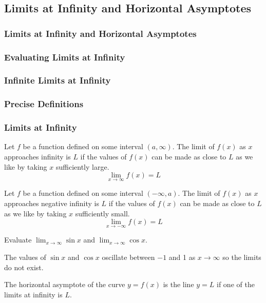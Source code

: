 \subsection{Limits at Infinity and Horizontal Asymptotes}

\subsubsection*{Limits at Infinity and Horizontal Asymptotes}

\subsubsection*{Evaluating Limits at Infinity}

\subsubsection*{Infinite Limits at Infinity}

\subsubsection*{Precise Definitions}

\subsubsection*{Limits at Infinity}
\begin{definition}
    Let \(f\) be a function defined on some interval \((a,\infty)\).
    The limit of \(f(x)\) as \(x\) approaches infinity is \(L\) if the values
    of \(f(x)\) can be made as close to \(L\) as we like by taking \(x\)
    sufficiently large.
    \[\lim_{x\to\infty}f(x)=L\]
\end{definition}
\begin{definition}
    Let \(f\) be a function defined on some interval \((-\infty,a)\).
    The limit of \(f(x)\) as \(x\) approaches negative infinity is \(L\) if
    the values of \(f(x)\) can be made as close to \(L\) as we like by taking
    \(x\) sufficiently small.
    \[\lim_{x\to -\infty}f(x)=L\]
\end{definition}
\begin{problem}
    Evaluate \(\lim_{x\to\infty}\sin x\) and \(\lim_{x\to\infty}\cos x\).
\end{problem}
\begin{solution}
    The values of \(\sin x\) and \(\cos x\) oscillate between \(-1\) and 1 as
    \(x\to\infty\) so the limits do not exist.
\end{solution}
\begin{definition}
    The horizontal asymptote of the curve \(y=f(x)\) is the line \(y=L\) if
    one of the limits at infinity is \(L\).
\end{definition}

